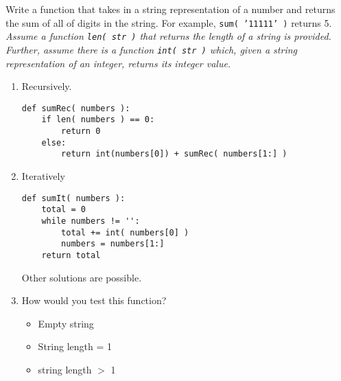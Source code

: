 Write a function that takes in a string representation of a number and returns the sum
        of all of digits in the string. For example, \texttt{sum( '11111' )} returns 5. \\
        \emph{Assume a function \texttt{len( str )} that returns the length of a string is provided. \\
         Further, assume there is a function \texttt{int( str )} which, given a string representation of an integer, returns its integer value.}

        \begin{enumerate}
            \item Recursively. 
\begin{answer}
\begin{lstlisting}
def sumRec( numbers ):
    if len( numbers ) == 0:
        return 0
    else:
        return int(numbers[0]) + sumRec( numbers[1:] )
\end{lstlisting}
\end{answer}

            \item Iteratively
\begin{answer}
\begin{lstlisting}
def sumIt( numbers ):
    total = 0
    while numbers != '':
        total += int( numbers[0] )
        numbers = numbers[1:]
    return total
\end{lstlisting}
Other solutions are possible.
\end{answer}
            \vspace{.25in}
    		\item How would you test this function?
                \begin{answer}
                \begin{itemize}
                    \item Empty string 
                    \item String length = 1
                    \item string length $>$ 1
                \end{itemize}
                \end{answer}
\end{enumerate}
